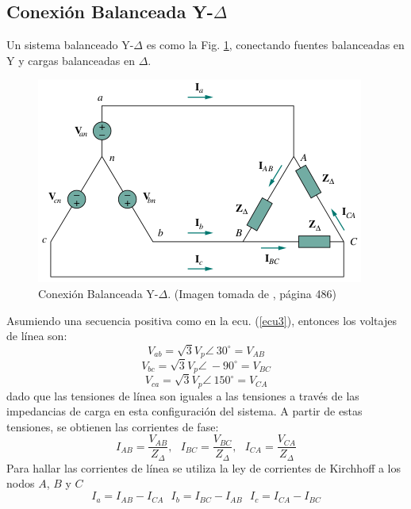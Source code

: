 \documentclass[twocolumn]{IEEEtran}
\begin{document}
\subsection{Conexión Balanceada Y-$\Delta$}
\noindent
Un sistema balanceado Y-$\Delta$ es como la Fig. \ref{fig9}, conectando fuentes balanceadas en Y y cargas balanceadas en $\Delta$.
\begin{figure}[H]
	\centering
		\includegraphics[scale=0.6]{ydelta.png}
	\caption{Conexión Balanceada Y-$\Delta$. (Imagen tomada de \cite{sadiku}, página 486)}
	\label{fig9}
\end{figure}
\noindent
Asumiendo una secuencia positiva como en la ecu. (\ref{ecu3}), entonces los voltajes de línea son:
\begin{equation}
 V_{ab} = \sqrt{3} V_p \angle\ 30 ^{\circ} = V_{AB}
\label{ecu21}
\end{equation}
\begin{equation}
 V_{bc} = \sqrt{3} V_p \angle\ -90 ^{\circ} = V_{BC}
\label{ecu22}
\end{equation}
\begin{equation}
 V_{ca} = \sqrt{3} V_p \angle\ 150 ^{\circ} = V_{CA}
\label{ecu23}
\end{equation}
\noindent
dado que las tensiones de línea son iguales a las tensiones a través de las impedancias de carga en esta configuración del sistema. A partir de estas tensiones, se obtienen las corrientes de fase:
\begin{equation}
 I_{AB} = \frac{V_{AB}}{Z_{\Delta}}, \ \ \ I_{BC} = \frac{V_{BC}}{Z_{\Delta}}, \ \ \ I_{CA} = \frac{V_{CA}}{Z_{\Delta}}
\label{ecu24}
\end{equation}
\noindent
Para hallar las corrientes de línea se utiliza la ley de corrientes de Kirchhoff a los nodos $A$, $B$ y $C$
\begin{equation}
 I_a = I_{AB} - I_{CA} \ \ \ I_b = I_{BC} - I_{AB} \ \ \ I_c = I_{CA} - I_{BC}
\label{ecu25}
\end{equation}
\end{document}
